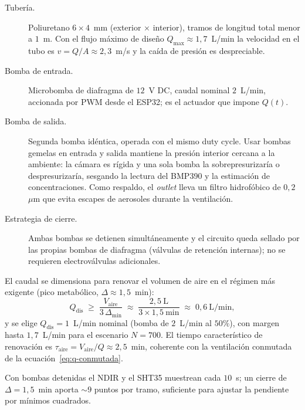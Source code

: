 \begin{description}
  \item[Tubería.] Poliuretano $6 \times 4$~mm (exterior $\times$ interior),
  tramos de longitud total menor a $1$~m. Con el flujo máximo de diseño
  $Q_{\max} \approx 1{,}7$~L/min la velocidad en el tubo es
  $v = Q/A \approx 2{,}3$~m/s y la caída de presión es despreciable.
  \item[Bomba de entrada.] Microbomba de diafragma de $12$~V DC, caudal
  nominal $2$~L/min, accionada por PWM desde el ESP32; es el actuador que
  impone $Q(t)$.
  \item[Bomba de salida.] Segunda bomba idéntica, operada con el mismo duty
  cycle. Usar bombas gemelas en entrada y salida mantiene la presión interior
  cercana a la ambiente: la cámara es rígida y una sola bomba la
  sobrepresurizaría o despresurizaría, sesgando la lectura del BMP390 y la
  estimación de concentraciones. Como respaldo, el \emph{outlet} lleva un
  filtro hidrofóbico de $0{,}2$~$\mu$m que evita escapes de aerosoles durante
  la ventilación.
  \item[Estrategia de cierre.] Ambas bombas se detienen simultáneamente y el
  circuito queda sellado por las propias bombas de diafragma (válvulas de
  retención internas); no se requieren electroválvulas adicionales.
\end{description}

El caudal se dimensiona para renovar el volumen de aire en el régimen más
exigente (pico metabólico, $\Delta \approx 1{,}5$~min):
\begin{equation}\label{eq:q-dimensionamiento}
  Q_{\mathrm{dis}}
  \;\geq\; \frac{V_{\mathrm{aire}}}{3\,\Delta_{\min}}
  \;\approx\; \frac{2{,}5~\mathrm{L}}{3 \times 1{,}5~\mathrm{min}}
  \;\approx\; 0{,}6~\mathrm{L/min},
\end{equation}
y se elige $Q_{\mathrm{dis}} = 1$~L/min nominal (bomba de $2$~L/min al
$50\%$), con margen hasta $1{,}7$~L/min para el escenario $N = 700$. El
tiempo característico de renovación es
$\tau_{\mathrm{aire}} = V_{\mathrm{aire}}/Q \approx 2{,}5$~min, coherente con
la ventilación conmutada de la ecuación~\eqref{eq:q-conmutada}.

\begin{remark}\label{rem:muestreo-cierres}
Con bombas detenidas el NDIR y el SHT35 muestrean cada $10$~s; un cierre de
$\Delta = 1{,}5$~min aporta $\sim 9$ puntos por tramo, suficiente para ajustar
la pendiente por mínimos cuadrados.
\end{remark}

